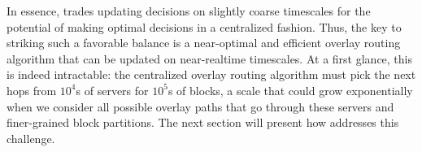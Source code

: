 In essence, \name trades updating decisions on slightly coarse timescales
for the potential of making optimal decisions in a centralized
fashion.
Thus, the key to striking such a favorable balance is a
near-optimal and efficient overlay routing
algorithm that can be updated on near-realtime timescales.
At a first glance, this is indeed intractable:
the centralized overlay routing algorithm must pick the next hops
from $10^4$s of servers for $10^5$s of blocks, a scale that could
grow exponentially when we consider all possible
overlay paths that go through these servers and finer-grained block partitions.
The next section will present how \name addresses this challenge.


%
%
%
%
%
%



